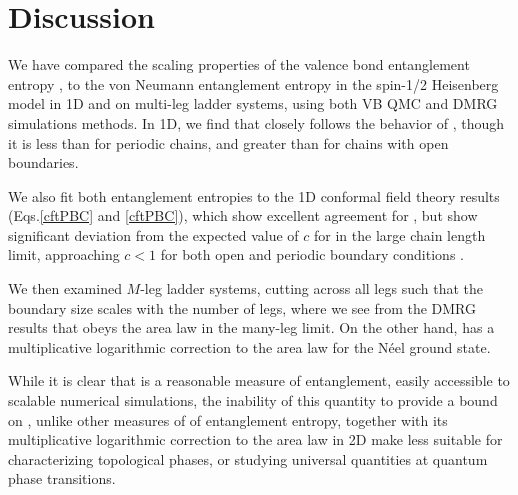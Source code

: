 \section{Discussion}

We have compared the scaling properties of the valence bond entanglement entropy \vb \cite{Alet,Chh}, to the von Neumann entanglement entropy \vn in the spin-1/2 Heisenberg model in 1D and on multi-leg ladder systems, using both VB QMC and DMRG simulations methods.
In 1D, we find that \vb closely follows the behavior of \vN, though it is less than \vn for periodic chains, and greater than  \vn for chains with open boundaries.

We also fit both entanglement entropies to the 1D conformal field theory results (Eqs.\eqref{cftPBC} and \eqref{cftPBC}), which show excellent agreement for \vN, but show significant deviation from the expected value of $c$ for \vb in the large chain length limit, approaching $c<1$ for both open and periodic boundary conditions \cite{XXX}.

We then examined $M$-leg ladder systems, cutting across all legs such that the boundary size scales with the number of legs, where we see from the DMRG results that \vn obeys the area law in the many-leg limit.  
On the other hand, \vb has a multiplicative logarithmic correction to the area law for the N\'eel ground state.


While it is clear that \vb is a reasonable measure of entanglement, easily accessible to scalable numerical simulations, the inability of this quantity to provide a bound on \vN, unlike other measures of of entanglement entropy, together with its multiplicative logarithmic correction to the area law in 2D make \vb less suitable for characterizing topological phases, or studying universal quantities at quantum phase transitions.












